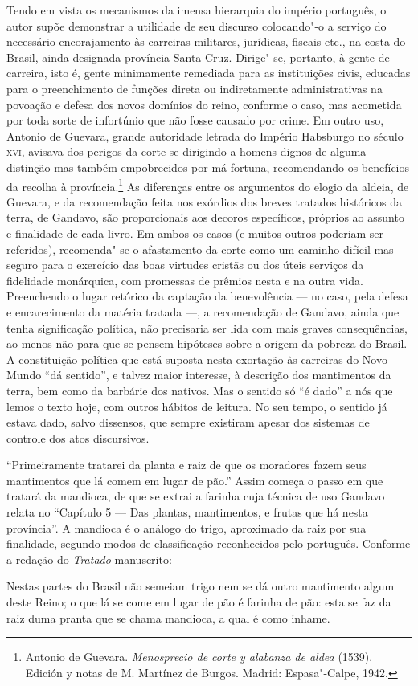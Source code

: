 Tendo em vista os mecanismos da imensa hierarquia do império português,
o autor supõe demonstrar a utilidade de seu discurso colocando"-o a
serviço do necessário encorajamento às carreiras militares, jurídicas,
fiscais etc., na costa do Brasil, ainda designada província Santa
Cruz. Dirige"-se, portanto, à gente de carreira, isto é, gente
minimamente remediada para as instituições civis, educadas para o
preenchimento de funções direta ou indiretamente administrativas na
povoação e defesa dos novos domínios do reino, conforme o caso, mas
acometida por toda sorte de infortúnio que não fosse causado por crime.
Em outro uso, Antonio de Guevara, grande autoridade letrada do Império
Habsburgo no século \textsc{xvi}, avisava dos perigos da corte se dirigindo a
homens dignos de alguma distinção mas também empobrecidos por má
fortuna, recomendando os benefícios da recolha à província.\footnote{ Antonio 
de Guevara. \textit{Menosprecio de corte y alabanza de aldea} (1539).
Edición y notas de M. Martínez de Burgos. Madrid: Espasa"-Calpe, 1942.}
As diferenças entre os argumentos do elogio da aldeia, de Guevara, e da
recomendação feita nos exórdios dos breves tratados históricos da
terra, de Gandavo, são proporcionais aos decoros específicos, próprios
ao assunto e finalidade de cada livro. Em ambos os casos (e muitos
outros poderiam ser referidos), recomenda"-se o afastamento da corte
como um caminho difícil mas seguro para o exercício das boas virtudes
cristãs ou dos úteis serviços da fidelidade monárquica, com promessas
de prêmios nesta e na outra vida. Preenchendo o lugar retórico da
captação da benevolência --- no caso, pela defesa  e encarecimento da
matéria tratada ---, a recomendação de Gandavo, ainda que tenha
significação política, não precisaria ser lida com mais graves
consequências, ao menos não para que se pensem hipóteses sobre a origem
da pobreza do Brasil. A constituição política que está suposta nesta
exortação às carreiras do Novo Mundo ``dá sentido'', e talvez maior interesse, 
à descrição dos mantimentos da terra, bem como da barbárie dos nativos. 
Mas o sentido só ``é dado'' a nós que lemos o texto hoje, com outros hábitos de leitura. 
No seu tempo, o sentido já estava dado, salvo dissensos, que sempre existiram 
apesar dos sistemas de controle dos atos discursivos. 

``Primeiramente tratarei da planta e raiz de que os
moradores fazem seus mantimentos que lá comem em lugar de
pão.'' Assim começa o passo em que tratará da mandioca, de
que se extrai a farinha cuja técnica de uso Gandavo relata no
``Capítulo 5 --- Das plantas, mantimentos, e frutas que há
nesta província''. A mandioca é o análogo do trigo,
aproximado da raiz por sua finalidade, segundo modos de classificação
reconhecidos pelo português. Conforme a redação do \textit{Tratado} manuscrito:
\begin{hedraquote}
Nestas partes do Brasil não semeiam trigo nem se dá outro mantimento algum
deste Reino; o que lá se come em lugar de pão é farinha de pão: esta
se faz da raiz duma pranta que se chama mandioca, a qual é como inhame.
\end{hedraquote}

